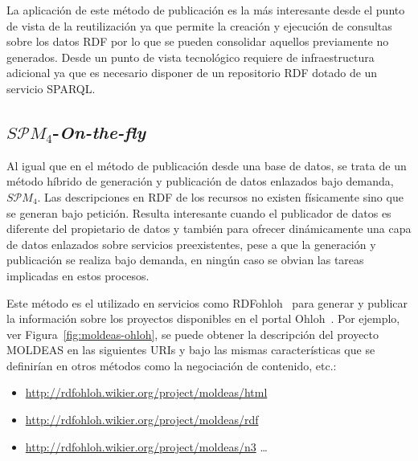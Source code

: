 La aplicación de este método de publicación es la más interesante desde el punto de vista
de la reutilización ya que permite la creación y ejecución de consultas sobre los datos RDF por lo que
se pueden consolidar aquellos previamente no generados. Desde un punto de vista tecnológico requiere
de infraestructura adicional ya que es necesario disponer de un repositorio RDF dotado de un servicio SPARQL.

\subsection{$S\mathcal{P}M_{4}$-\textit{On-the-fly}}
Al igual que en el método de publicación desde una base de datos, se trata de un método híbrido
de generación y publicación de datos enlazados bajo demanda, $S\mathcal{P}M_{4}$. Las descripciones en \gls{RDF} de los
recursos no existen físicamente sino que se generan bajo petición. Resulta interesante cuando
el publicador de datos es diferente del propietario de datos y también para ofrecer
dinámicamente una capa de datos enlazados sobre servicios preexistentes, pese a que la generación
y publicación se realiza bajo demanda, en ningún caso se obvian las tareas implicadas en estos procesos.

Este método es el utilizado en servicios como RDFohloh~\cite{Ferndez08rdfohloh} para generar y publicar la información
sobre los proyectos disponibles en el portal Ohloh~\cite{ohloh}. Por ejemplo, ver Figura~\ref{fig:moldeas-ohloh}, se puede obtener la descripción
del proyecto \gls{MOLDEAS} en las siguientes \gls{URI}s y bajo las mismas características que se definirían en otros métodos como la negociación de contenido, etc.:
\begin{itemize}
 \item \url{http://rdfohloh.wikier.org/project/moldeas/html}
 \item \url{http://rdfohloh.wikier.org/project/moldeas/rdf}
 \item \url{http://rdfohloh.wikier.org/project/moldeas/n3} \ldots
\end{itemize}


